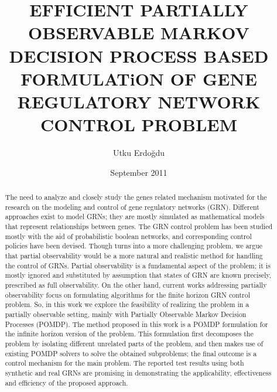 \documentclass[11pt,oneandhalf,chaparabic]{metu}
\author{Utku Erdoğdu}
\title{EFFICIENT PARTIALLY OBSERVABLE MARKOV DECISION PROCESS BASED FORMULATiON OF GENE REGULATORY NETWORK CONTROL PROBLEM}
\date{September 2011}
\begin{document}
\begin{preliminaries}
\maketitle
\makeapproval
\plagiarism
\setlength{\parindent}{0em}
\setlength{\parskip}{10pt}

\begin{abstract} \oneandhalfspacing
The need to analyze and closely study the genes related mechanism motivated for the research on the 
modeling and control of gene regulatory networks (GRN). Different approaches exist to model GRNs; they 
are mostly simulated as mathematical models that represent relationships between genes. The GRN control 
problem has been studied mostly with the aid of probabilistic boolean networks, and corresponding control 
policies have been devised. Though turns into a more challenging problem, we argue that partial observability 
would be a more natural and realistic method for handling the control of GRNs. Partial observability 
is a fundamental aspect of the problem; it is mostly ignored and substituted by assumption that states 
of GRN are known precisely, prescribed as full observability. On the other hand, current works addressing 
partially observability focus on formulating algorithms for the finite horizon GRN control problem. 
So, in this work we explore the feasibility of realizing the problem in a partially observable 
setting, mainly with Partially Observable Markov Decision Processes (POMDP). The method proposed in 
this work is a POMDP formulation for the infinite horizon version of the problem. This formulation 
first decomposes the problem by isolating different unrelated parts of the problem, and then makes 
use of existing POMDP solvers to solve the obtained subproblems; the final outcome is a control mechanism 
for the main problem. The reported test results using both synthetic and real GRNs are promising in 
demonstrating the applicability, effectiveness and efficiency of the proposed approach.
\end{abstract}


\end{preliminaries}
\end{document}
